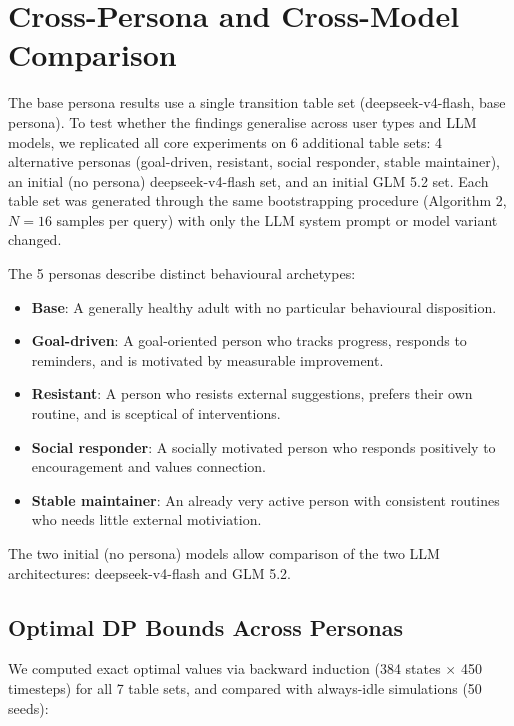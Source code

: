 \documentclass[11pt]{article}
\begin{document}
\section{Cross-Persona and Cross-Model Comparison}

The base persona results use a single transition table set (deepseek-v4-flash, base persona). To test whether the findings generalise across user types and LLM models, we replicated all core experiments on 6 additional table sets: 4 alternative personas (goal-driven, resistant, social responder, stable maintainer), an initial (no persona) deepseek-v4-flash set, and an initial GLM 5.2 set. Each table set was generated through the same bootstrapping procedure (Algorithm 2, $N=16$ samples per query) with only the LLM system prompt or model variant changed.

The 5 personas describe distinct behavioural archetypes:
\begin{itemize}
  \item \textbf{Base}: A generally healthy adult with no particular behavioural disposition.
  \item \textbf{Goal-driven}: A goal-oriented person who tracks progress, responds to reminders, and is motivated by measurable improvement.
  \item \textbf{Resistant}: A person who resists external suggestions, prefers their own routine, and is sceptical of interventions.
  \item \textbf{Social responder}: A socially motivated person who responds positively to encouragement and values connection.
  \item \textbf{Stable maintainer}: An already very active person with consistent routines who needs little external motiviation.
\end{itemize}

The two initial (no persona) models allow comparison of the two LLM architectures: deepseek-v4-flash and GLM 5.2.

\subsection{Optimal DP Bounds Across Personas}

We computed exact optimal values via backward induction (384 states $\times$ 450 timesteps) for all 7 table sets, and compared with always-idle simulations (50 seeds):
\end{document}
